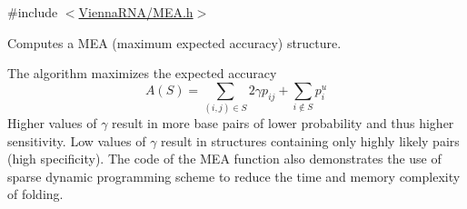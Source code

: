 {\ttfamily \#include $<$\mbox{\hyperlink{_m_e_a_8h}{Vienna\+R\+N\+A/\+M\+E\+A.\+h}}$>$}



Computes a M\+EA (maximum expected accuracy) structure. 

The algorithm maximizes the expected accuracy \[ A(S) = \sum_{(i,j) \in S} 2 \gamma p_{ij} + \sum_{i \notin S} p^u_i \] Higher values of $\gamma$ result in more base pairs of lower probability and thus higher sensitivity. Low values of $\gamma$ result in structures containing only highly likely pairs (high specificity). The code of the M\+EA function also demonstrates the use of sparse dynamic programming scheme to reduce the time and memory complexity of folding. 